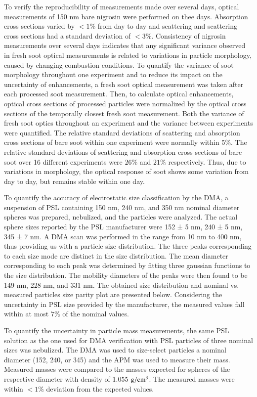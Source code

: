 To verify the reproducibility of measurements made over several days, optical measurements of 150 nm bare nigrosin were performed on thee days. Absorption cross sections varied by $<1\%$ from day to day and scattering and scattering cross sections had a standard deviation of $<3\%$. Consistency of nigrosin measurements over several days indicates that any significant variance observed in fresh soot optical measurements is related to variations in particle morphology, caused by changing combustion conditions. To quantify the variance of soot morphology throughout one experiment and to reduce its impact on the uncertainty of enhancements, a fresh soot optical measurement was taken after each processed soot measurement. Then, to calculate optical enhancements, optical cross sections of processed particles were normalized by the optical cross sections of the temporally closest fresh soot measurement. Both the variance of fresh soot optics throughout an experiment and the variance between experiments were quantified. The relative standard deviations of scattering and absorption cross sections of bare soot within one experiment were normally within $5\%$. The relative standard deviations of scattering and absorption cross sections of bare soot over 16 different experiments were $26\%$ and $21\%$ respectively. Thus, due to variations in morphology, the optical response of soot shows some variation from day to day, but remains stable within one day.

To quantify the accuracy of electrostatic size classification by the DMA, a suspension of PSL containing 150 nm, 240 nm, and 350 nm nominal diameter spheres was prepared, nebulized, and the particles were analyzed. The actual sphere sizes reported by the PSL manufacturer were 152 ± 5 nm, 240 ± 5 nm, 345 ± 7 nm. A DMA scan was performed in the range from 10 nm to 400 nm, thus providing us with a particle size distribution. The three peaks corresponding to each size mode are distinct in the size distribution. The mean diameter corresponding to each peak was determined by fitting three gaussian functions to the size distribution. The mobility diameters of the peaks were then found to be 149 nm, 228 nm, and 331 nm. The obtained size distribution and nominal vs. measured particles size parity plot are presented below. Considering the uncertainty in PSL size provided by the manufacturer, the measured values fall within at most $7\%$ of the nominal values.

To quantify the uncertainty in particle mass measurements, the same PSL solution as the one used for DMA verification with PSL particles of three nominal sizes was nebulized. The DMA was used to size-select particles a nominal diameter (152, 240, or 345) and the APM was used to measure their mass. Measured masses were compared to the masses expected for spheres of the respective diameter with density of 1.055 $\rm g/cm^3$. The measured masses were within $<1\%$ deviation from the expected values.

